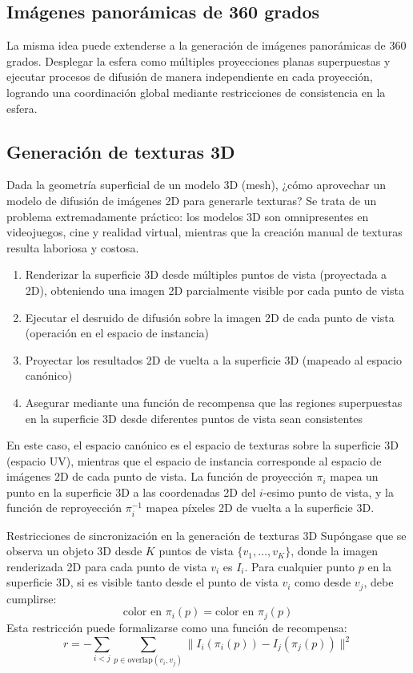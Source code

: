 \documentclass[a4paper]{article}
\begin{document}
\subsection{Imágenes panorámicas de 360 grados}

La misma idea puede extenderse a la generación de imágenes panorámicas de 360 grados. Desplegar la esfera como múltiples proyecciones planas superpuestas y ejecutar procesos de difusión de manera independiente en cada proyección, logrando una coordinación global mediante restricciones de consistencia en la esfera.

\subsection{Generación de texturas 3D}

Dada la geometría superficial de un modelo 3D (mesh), ¿cómo aprovechar un modelo de difusión de imágenes 2D para generarle texturas? Se trata de un problema extremadamente práctico: los modelos 3D son omnipresentes en videojuegos, cine y realidad virtual, mientras que la creación manual de texturas resulta laboriosa y costosa.

\begin{enumerate}
    \item Renderizar la superficie 3D desde múltiples puntos de vista (proyectada a 2D), obteniendo una imagen 2D parcialmente visible por cada punto de vista
    \item Ejecutar el desruido de difusión sobre la imagen 2D de cada punto de vista (operación en el espacio de instancia)
    \item Proyectar los resultados 2D de vuelta a la superficie 3D (mapeado al espacio canónico)
    \item Asegurar mediante una función de recompensa que las regiones superpuestas en la superficie 3D desde diferentes puntos de vista sean consistentes
\end{enumerate}

En este caso, el espacio canónico es el espacio de texturas sobre la superficie 3D (espacio UV), mientras que el espacio de instancia corresponde al espacio de imágenes 2D de cada punto de vista. La función de proyección $\pi_i$ mapea un punto en la superficie 3D a las coordenadas 2D del $i$-esimo punto de vista, y la función de reproyección $\pi_i^{-1}$ mapea píxeles 2D de vuelta a la superficie 3D.

\begin{importantbox}{Restricciones de sincronización en la generación de texturas 3D}
Supóngase que se observa un objeto 3D desde $K$ puntos de vista $\{v_1, \ldots, v_K\}$, donde la imagen renderizada 2D para cada punto de vista $v_i$ es $I_i$. Para cualquier punto $p$ en la superficie 3D, si es visible tanto desde el punto de vista $v_i$ como desde $v_j$, debe cumplirse:
$$\text{color en } \pi_i(p) = \text{color en } \pi_j(p)$$
Esta restricción puede formalizarse como una función de recompensa:
$$r = -\sum_{i < j} \sum_{p \in \text{overlap}(v_i, v_j)} \| I_i(\pi_i(p)) - I_j(\pi_j(p)) \|^2$$
\end{importantbox}
\end{document}

